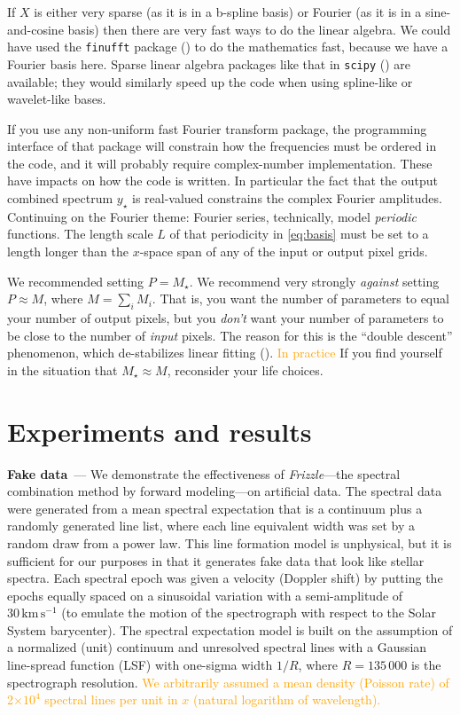 \documentclass[modern, linenumbers]{aastex631}
\renewcommand{\paragraph}[1]{\medskip\par\noindent\textbf{#1}~---}
\newcommand{\name}{\textsl{Frizzle}}
\newcommand{\unit}[1]{\mathrm{#1}}
\newcommand{\kmps}{\unit{km\,s^{-1}}}
\newcommand{\modified}[1]{\textcolor{orange}{#1}}
\begin{document}
If $X$ is either very sparse (as it is in a b-spline basis) or Fourier (as it is in a sine-and-cosine basis) then there are very fast ways to do the linear algebra.
We could have used the \texttt{finufft} package (\citealt{finufft}) to do the mathematics fast, because we have a Fourier basis here.
Sparse linear algebra packages like that in \texttt{scipy} (\citealt{scipy}) are available; they would similarly speed up the code when using spline-like or wavelet-like bases.

If you use any non-uniform fast Fourier transform package, the programming interface of that package will constrain how the frequencies must be ordered in the code, and it will probably require complex-number implementation.
These have impacts on how the code is written.
In particular the fact that the output combined spectrum $y_\star$ is real-valued constrains the complex Fourier amplitudes.
Continuing on the Fourier theme:
Fourier series, technically, model \emph{periodic} functions.
The length scale $L$ of that periodicity in \eqref{eq:basis} must be set to a length longer than the $x$-space span of any of the input or output pixel grids.

We recommended setting $P=M_\star$.
We recommend very strongly \emph{against} setting $P\approx M$, where $M=\sum_i M_i$.
That is, you want the number of parameters to equal your number of output pixels, but you \emph{don't} want your number of parameters to be close to the number of \emph{input} pixels.
The reason for this is the ``double descent'' phenomenon, which de-stabilizes linear fitting (\citealt{doubledescent}).
\modified{In practice}
If you find yourself in the situation that $M_\star\approx M$, reconsider your life choices.

\section{Experiments and results}\label{sec:results}

\paragraph{Fake data}
We demonstrate the effectiveness of \name{}---the spectral combination method by forward modeling---on artificial data.
The spectral data were generated from a mean spectral expectation that is a continuum plus a randomly generated line list, where each line equivalent width was set by a random draw from a power law. 
This line formation model is unphysical, but it is sufficient for our purposes in that it generates fake data that look like stellar spectra.
Each spectral epoch was given a velocity (Doppler shift) by putting the epochs equally spaced on a sinusoidal variation with a semi-amplitude of $30\,\kmps$ (to emulate the motion of the spectrograph with respect to the Solar System barycenter).
The spectral expectation model is built on the assumption of a normalized (unit) continuum and unresolved spectral lines with a Gaussian line-spread function (LSF) with one-sigma width $1/R$, where $R=135\,000$ is the spectrograph resolution. \modified{We arbitrarily assumed a mean density (Poisson rate) of 2$\times{}10^4$ spectral lines per unit in $x$ (natural logarithm of wavelength).}
\end{document}
